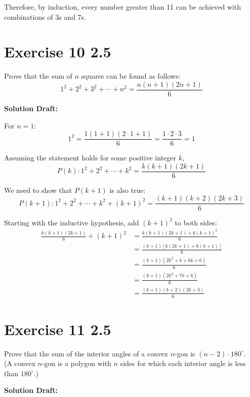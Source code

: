 \documentclass{article}
\begin{document}
Therefore, by induction, every number greater than 11 can be achieved with combinations of 3s and 7s.

\section*{Exercise 10 2.5}  

Prove that the sum of \( n \) squares can be found as follows:
\[ 1^2 + 2^2 + 3^2 + \cdots + n^2 = \frac{n(n + 1)(2n + 1)}{6} \]

\vspace{0.5cm}
\noindent\textbf{Solution Draft:} 
\vspace{0.2cm}

For \( n = 1 \):
\[ 1^2 = \frac{1(1 + 1)(2 \cdot 1 + 1)}{6} = \frac{1 \cdot 2 \cdot 3}{6} = 1 \]

Assuming the statement holds for some positive integer \( k \),
\[ P(k): 1^2 + 2^2 + \cdots + k^2 = \frac{k(k + 1)(2k + 1)}{6} \]

We need to show that \( P(k + 1) \) is also true:
\[ P(k + 1): 1^2 + 2^2 + \cdots + k^2 + (k + 1)^2 = \frac{(k + 1)(k + 2)(2k + 3)}{6} \]

Starting with the inductive hypothesis, add \( (k + 1)^2 \) to both sides:
\begin{align*}
\frac{k(k + 1)(2k + 1)}{6} + (k + 1)^2 &= \frac{k(k + 1)(2k + 1) + 6(k + 1)^2}{6} \\
&= \frac{(k + 1)[k(2k + 1) + 6(k + 1)]}{6} \\
&= \frac{(k + 1)(2k^2 + k + 6k + 6)}{6} \\
&= \frac{(k + 1)(2k^2 + 7k + 6)}{6} \\
&= \frac{(k + 1)(k + 2)(2k + 3)}{6}
\end{align*}

\section*{Exercise 11 2.5}  

Prove that the sum of the interior angles of a convex \(n\)-gon is \((n - 2) \cdot 180^\circ\). \\
(A convex \(n\)-gon is a polygon with \(n\) sides for which each interior angle is less than \(180^\circ\).)


\vspace{0.5cm}
\noindent\textbf{Solution Draft:} 
\vspace{0.2cm}
\end{document}
